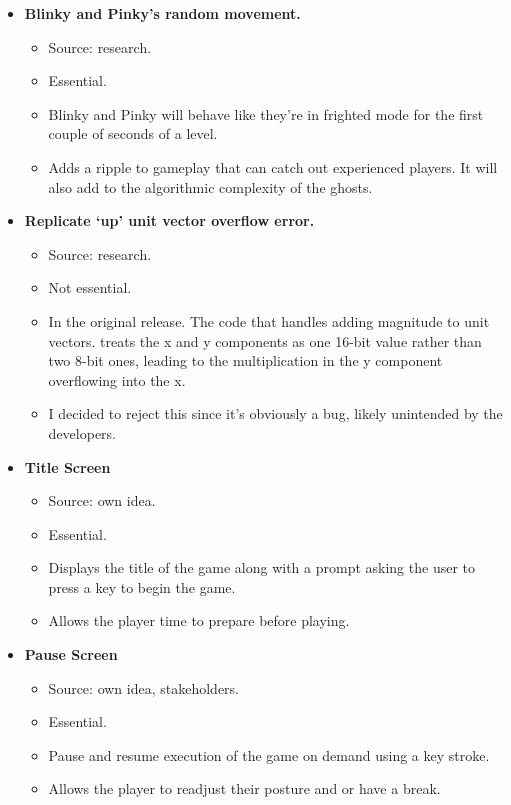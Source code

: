 \documentclass[letterpaper, 11pt]{article}
\begin{document}
\begin{itemize}
\item \textbf{Blinky and Pinky’s random movement.}
\begin{itemize}
\item Source: research.
\item Essential.
\item Blinky and Pinky will behave like they’re in frighted mode for the first couple of seconds of a level.
\item Adds a ripple to gameplay that can catch out experienced players.
It will also add to the algorithmic complexity of the ghosts.
\end{itemize}
\end{itemize}


\begin{itemize}
\item \textbf{Replicate ‘up’ unit vector overflow error.}
\begin{itemize}
\item Source: research.
\item Not essential.
\item In the original release.
The code that handles adding magnitude to unit vectors. treats the x and y components as one 16-bit value rather than two 8-bit ones, leading to the multiplication in the y component overflowing into the x.
\item I decided to reject this since it’s obviously a bug, likely unintended by the developers.
\end{itemize}

\item \textbf{Title Screen}
\begin{itemize}
\item Source: own idea.
\item Essential.
\item Displays the title of the game along with a prompt asking the user to press a key to begin the game.
\item Allows the player time to prepare before playing.
\end{itemize}

\item \textbf{Pause Screen}
\begin{itemize}
\item Source: own idea, stakeholders.
\item Essential.
\item Pause and resume execution of the game on demand using a key stroke.
\item Allows the player to readjust their posture and or have a break.
\end{itemize}


\end{itemize}
\end{document}
